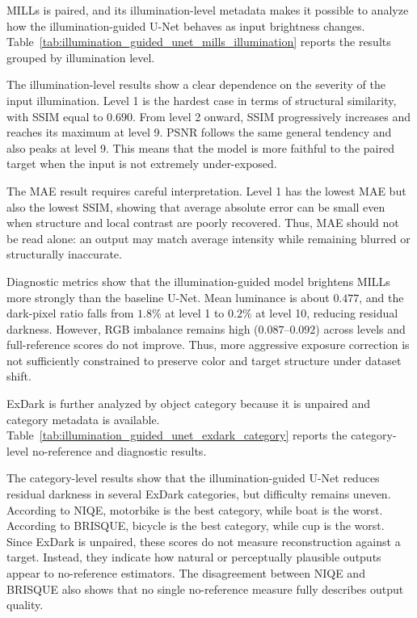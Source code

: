 MILLs is paired, and its illumination-level metadata makes it possible to analyze how the illumination-guided U-Net behaves as input brightness changes. Table~\ref{tab:illumination_guided_unet_mills_illumination} reports the results grouped by illumination level.



The illumination-level results show a clear dependence on the severity of the input illumination. Level 1 is the hardest case in terms of structural similarity, with SSIM equal to $0.690$. From level 2 onward, SSIM progressively increases and reaches its maximum at level 9. PSNR follows the same general tendency and also peaks at level 9. This means that the model is more faithful to the paired target when the input is not extremely under-exposed.

The MAE result requires careful interpretation. Level 1 has the lowest MAE but also the lowest SSIM, showing that average absolute error can be small even when structure and local contrast are poorly recovered. Thus, MAE should not be read alone: an output may match average intensity while remaining blurred or structurally inaccurate.

Diagnostic metrics show that the illumination-guided model brightens MILLs more strongly than the baseline U-Net. Mean luminance is about $0.477$, and the dark-pixel ratio falls from $1.8\%$ at level 1 to $0.2\%$ at level 10, reducing residual darkness. However, RGB imbalance remains high ($0.087$--$0.092$) across levels and full-reference scores do not improve. Thus, more aggressive exposure correction is not sufficiently constrained to preserve color and target structure under dataset shift.

ExDark is further analyzed by object category because it is unpaired and category metadata is available. Table~\ref{tab:illumination_guided_unet_exdark_category} reports the category-level no-reference and diagnostic results.



The category-level results show that the illumination-guided U-Net reduces residual darkness in several ExDark categories, but difficulty remains uneven. According to NIQE, motorbike is the best category, while boat is the worst. According to BRISQUE, bicycle is the best category, while cup is the worst. Since ExDark is unpaired, these scores do not measure reconstruction against a target. Instead, they indicate how natural or perceptually plausible outputs appear to no-reference estimators. The disagreement between NIQE and BRISQUE also shows that no single no-reference measure fully describes output quality.

